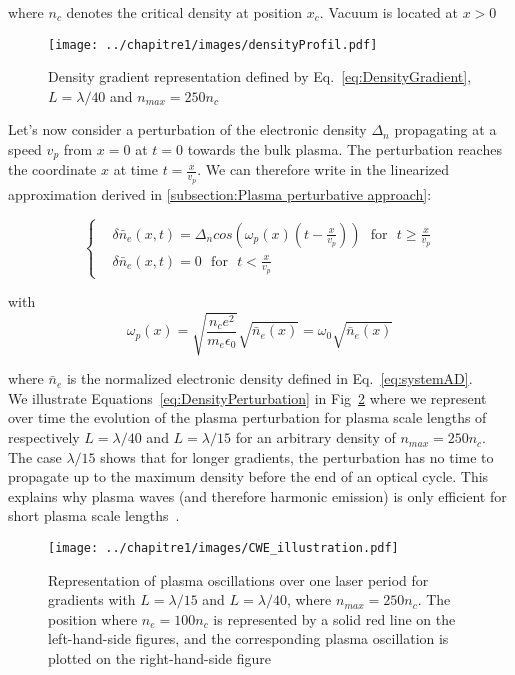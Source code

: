 \noindent where $n_c$ denotes the critical density at position $x_c$. Vacuum is located at $x>0$


\begin{figure}[H]
\centering
\texttt{[image: ../chapitre1/images/densityProfil.pdf]}\\
\caption{\label{fig:Density Gradient}Density gradient representation defined by Eq.~\ref{eq:DensityGradient}, $L = \lambda / 40$ and $n_{max} = 250n_c$}
\end{figure}



\noindent Let's now consider a perturbation of the electronic density $\Delta_n$ propagating at a speed $v_p$ from $x = 0$ at $t = 0$ towards the bulk plasma. The perturbation reaches the coordinate $x$ at time $t = \frac{x}{v_p}$. We can therefore write in the linearized approximation derived in \ref{subsection:Plasma perturbative approach}:

\begin{equation}
  \left\{
      \begin{aligned}
&\delta\bar{n}_e(x,t) = \Delta_n cos(\omega_p(x) (t-\frac{x}{v_p})) \ \ \  \mbox{for} \ \ \  t \ge \frac{x}{v_p}\\
&\delta \bar{n}_e(x,t) = 0 \ \ \ \mbox{for} \ \ \  t < \frac{x}{v_p}
      \end{aligned}
    \right.
\label{eq:DensityPerturbation}
\end{equation}

\noindent with 
$$
\omega_p(x) = \sqrt{\frac{n_{c}e^2}{m_e\epsilon_0}} \sqrt{\bar{n}_e(x)}= \omega_0 \sqrt{\bar{n}_e(x)}
$$

\noindent where $\bar{n}_e$ is the normalized electronic density defined in Eq.~\ref{eq:systemAD}.\\

\noindent We illustrate Equations~\ref{eq:DensityPerturbation} in Fig~\ref{fig:CWE_illustration} where we represent over time the evolution of the plasma perturbation for plasma scale lengths of respectively $L = \lambda/40$ and $L=\lambda/15$ for an arbitrary density of $n_{max} = 250 n_{c}$. The case $\lambda/15$ shows that for longer gradients, the perturbation has no time to propagate up to the maximum density before the end of an optical cycle. This explains why plasma waves (and therefore harmonic emission) is only efficient for short plasma scale lengths~\cite{thaury2010high,TheseCedric,theseAnto,TheseArnaud}.

\begin{figure}[H]
\centering
\texttt{[image: ../chapitre1/images/CWE\_illustration.pdf]}\\
\caption{\label{fig:CWE_illustration} Representation of plasma oscillations over one laser period for gradients with $L = \lambda/15$ and $L = \lambda/40$, where $n_{max} = 250n_c$. The position where $n_e = 100 n_c$ is represented by a solid red line on the left-hand-side figures, and the corresponding plasma oscillation is plotted on the right-hand-side figure}
\end{figure}


